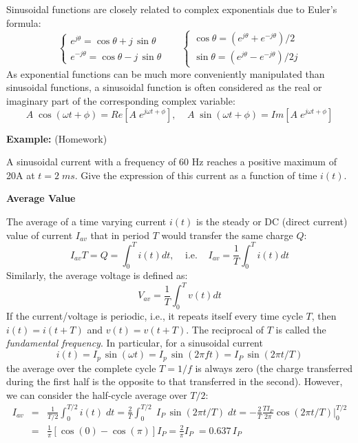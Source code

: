 Sinusoidal functions are closely related to complex exponentials due
to Euler's formula:
\[
\left\{ \begin{array}{l}
  e^{ j\theta}=\cos\theta+j\,\sin\theta\\
  e^{-j\theta}=\cos\theta-j\,\sin\theta \end{array} \right.
\;\;\;\;\;\;
\left\{ \begin{array}{l}
  \cos\theta=(e^{j\theta}+e^{-j\theta})/2\\
  \sin\theta=(e^{j\theta}-e^{-j\theta})/2j 
\end{array} \right.  
\]
As exponential functions can be much more conveniently manipulated 
than sinusoidal functions, a sinusoidal function is often considered
as the real or imaginary part of the corresponding complex variable:
\[
A\;\cos(\omega t+\phi)=Re[A\;e^{j\omega t+\phi}],\;\;\;\;
A\;\sin(\omega t+\phi)=Im[A\;e^{j\omega t+\phi}]	
\]


{\bf Example:} (Homework)

A sinusoidal current with a frequency of 60 Hz reaches a positive
maximum of 20A at $t=2 \; ms$. Give the expression of this current 
as a function of time $i(t)$.


{\bf Average Value} 

The average of a time varying current $i(t)$ is the steady or DC 
(direct current) value of current $I_{av}$ that in period $T$ would 
transfer the same charge $Q$:
\[	
I_{av}T=Q=\int_0^T i(t) dt,\;\;\;\;\mbox{i.e.}\;\;\;\;
I_{av}=\frac{1}{T}\int_0^T i(t) dt	
\]
Similarly, the average voltage is defined as:
\[
V_{av}=\frac{1}{T}\int_0^T v(t) dt	
\]
If the current/voltage is periodic, i.e., it repeats itself every 
time cycle $T$, then $i(t)=i(t+T)$ and $v(t)=v(t+T)$. The reciprocal 
of $T$ is called the {\em fundamental frequency}. In particular, for 
a sinusoidal current 
\[
i(t)=I_p\,\sin(\omega t)=I_p\,\sin(2\pi ft)=I_P\,\sin(2\pi t/T)
\]
the average over the complete cycle $T=1/f$ is always zero (the charge
transferred during the first half is the opposite to that transferred
in the second). However, we can consider the half-cycle average over 
$T/2$:
\begin{eqnarray} 
  I_{av}&=&\frac{1}{T/2}\int_0^{T/2} i(t)\; dt
  =\frac{2}{T}\int_0^{T/2} \;I_P\,\sin(2\pi t/T)\;dt	
  =-\frac{2}{T}\frac{TI_P}{2\pi} \cos(2\pi t/T)\bigg|_0^{T/2}
  \nonumber \\
  &=& \frac{1}{\pi}\left[\cos(0)-\cos(\pi)\right]I_P
  =\frac{2}{\pi}I_P\;=0.637\,I_P
  \nonumber
\end{eqnarray}

